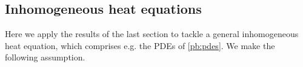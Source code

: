 \documentclass[english,a4paper,9pt,oneside]{scrbook}	%
\theoremstyle{break}
\theoremstyle{remark}
\newcommand{\ds}{\displaystyle}
\newcommand{\norm}[1]{\left\lVert#1\right\rVert}
\newcommand{\HN}[1]{\norm{#1}_{H}}
\newcommand{\VN}[1]{\norm{#1}_{V}}
\newcommand{\VSN}[1]{\norm{#1}_{V^*}}
\newcommand{\emb}{\hookrightarrow}
\begin{document}
\begin{appendices}
%
%
%
%
%
%
%
%
%
%
%
%
%

\section{Inhomogeneous heat equations}
\label{sec:pdes}
Here we apply the results of the last section to tackle a general inhomogeneous heat equation, which comprises e.g. the PDEs of \cref{pb:pdes}. We make the following assumption.



\end{appendices}
\end{document}
